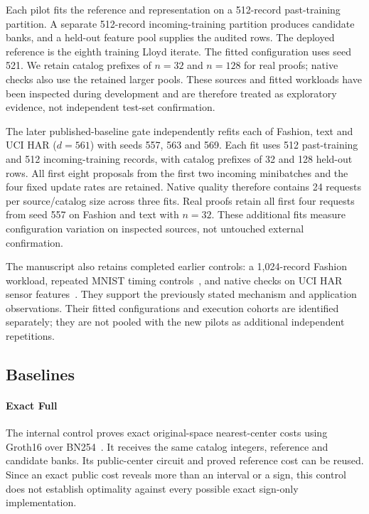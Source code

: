 Each pilot fits the reference and representation on a 512-record past-training
partition. A separate 512-record incoming-training partition produces candidate
banks, and a held-out feature pool supplies the audited rows. The deployed
reference is the eighth training Lloyd iterate. The fitted configuration uses
seed 521. We retain catalog prefixes of $n=32$ and $n=128$ for real proofs;
native checks also use the retained larger pools. These sources and fitted
workloads have been inspected during development and are therefore treated
as exploratory evidence, not independent test-set confirmation.

The later published-baseline gate independently refits each of Fashion,
text and UCI HAR ($d=561$) with seeds 557, 563 and 569. Each fit uses
512 past-training and 512 incoming-training records, with catalog prefixes
of 32 and 128 held-out rows. All first eight proposals from the first two
incoming minibatches and the four fixed update rates are retained. Native
quality therefore contains 24 requests per source/catalog size across
three fits. Real proofs retain all first four requests from seed 557 on
Fashion and text with $n=32$. These additional fits measure configuration
variation on inspected sources, not untouched external confirmation.

The manuscript also retains completed earlier controls: a 1,024-record
Fashion workload, repeated MNIST timing controls~\cite{lecun1998}, and native
checks on UCI HAR sensor features~\cite{ucihar2012}. They support the
previously stated mechanism and application observations. Their fitted
configurations and execution cohorts are identified separately; they are
not pooled with the new pilots as additional independent repetitions.

\subsection{Baselines}
\label{sec:ccd-baselines}
\paragraph{Exact Full}
The internal control proves exact original-space nearest-center costs using
Groth16 over BN254~\cite{groth2016}. It receives the same catalog integers,
reference and candidate banks. Its public-center circuit and proved reference
cost can be reused. Since an exact public cost reveals more than an interval
or a sign, this control does not establish optimality against every possible
exact sign-only implementation.

